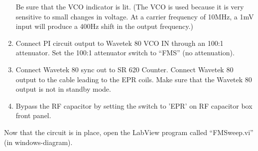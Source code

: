 \begin{enumerate}
Be sure that the VCO indicator is lit.
(The VCO is used because it is very sensitive to small changes in voltage.  
At a carrier frequency of 10MHz, a 1mV input will produce a 400Hz shift 
in the output frequency.)

\item Connect PI circuit output to Wavetek 80 VCO IN through an 100:1 attenuator. Set the 100:1 attenuator switch to ``FMS'' (no attenuation). 

\item Connect Wavetek 80 sync out to SR 620 Counter.  Connect  Wavetek 80 output to 
the cable leading to the EPR coils.  Make sure that the Wavetek 80
output is not in standby mode. 

\item Bypass the RF capacitor by setting the switch to 'EPR' 
on RF capacitor box front panel.
\end{enumerate}


Now that the circuit is in place, open the LabView program called ``FMSweep.vi'' (in windows-diagram).


